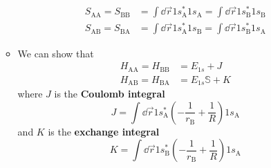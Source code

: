 \documentclass[../notes.tex]{subfiles}
\begin{document}
\begin{itemize}
\begin{itemize}
\begin{align*}
            S_{\text{A}\text{A}} = S_{\text{B}\text{B}} &= \int\dd{\vec{r}}1s_\text{A}^*1s_\text{A} = \int\dd{\vec{r}}1s_\text{B}^*1s_\text{B}\\
            S_{\text{A}\text{B}} = S_{\text{B}\text{A}} &= \int\dd{\vec{r}}1s_\text{A}^*1s_\text{B} = \int\dd{\vec{r}}1s_\text{B}^*1s_\text{A}
        \end{align*}
        \item We can show that
        \begin{align*}
            H_{\text{A}\text{A}} = H_{\text{B}\text{B}} &= E_{1s}+J\\
            H_{\text{A}\text{B}} = H_{\text{B}\text{A}} &= E_{1s}\mathbb{S}+K
        \end{align*}
        where $J$ is the \textbf{Coulomb integral}
        \begin{equation*}
            J = \int\dd{\vec{r}}1s_\text{A}^*\left( -\frac{1}{r_\text{B}}+\frac{1}{R} \right)1s_\text{A}
        \end{equation*}
        and $K$ is the \textbf{exchange integral}
        \begin{equation*}
            K = \int\dd{\vec{r}}1s_\text{B}^*\left( -\frac{1}{r_\text{B}}+\frac{1}{R} \right)1s_\text{A}
        \end{equation*}
    \end{itemize}
\end{itemize}
\end{document}
